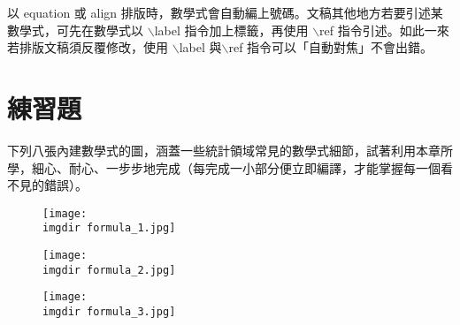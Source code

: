 \documentclass[12pt, a4paper]{article}
\begin{document}
以 {\A equation} 或 {\A align} 排版時，數學式會自動編上號碼。文稿其他地方若要引述某數學式，可先在數學式以 $\backslash${\A label} 指令加上標籤，再使用 $\backslash${\A ref} 指令引述。如此一來若排版文稿須反覆修改，使用 $\backslash${\A label} 與$\backslash${\A ref} 指令可以「自動對焦」不會出錯。

\section{練習題}
下列八張內建數學式的圖，涵蓋一些統計領域常見的數學式細節，試著利用本章所學，細心、耐心、一步步地完成（每完成一小部分便立即編譯，才能掌握每一個看不見的錯誤）。


\begin{figure}[h]
    \centering
        \texttt{[image: \\imgdir formula\_1.jpg]}
\end{figure}

\begin{figure}[h]
    \centering
        \texttt{[image: \\imgdir formula\_2.jpg]}
\end{figure}

\begin{figure}[h]
    \centering
        \texttt{[image: \\imgdir formula\_3.jpg]}
\end{figure}
\end{document}
